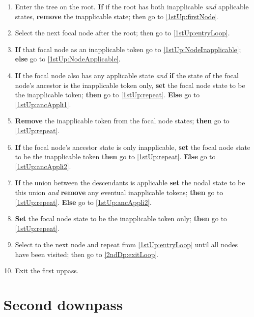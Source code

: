 \documentclass[a4paper,12pt]{article}
\begin{document}
\begin{enumerate}
    \item Enter the tree on the root. \textbf{If} if the root has both inapplicable \textit{and} applicable states, \textbf{remove} the inapplicable state; then go to \ref{1stUp:firstNode}.
    \item \label{1stUp:firstNode} Select the next focal node after the root; then go to \ref{1stUp:entryLoop}. 
    \item \label{1stUp:entryLoop} \textbf{If} that focal node as an inapplicable token go to \ref{1stUp:NodeInapplicable}; \textbf{else} go to \ref{1stUp:NodeApplicable}.
    \item \label{1stUp:NodeInapplicable} \textbf{If} the focal node also has any applicable state \textit{and} \textbf{if} the state of the focal node's ancestor is the inapplicable token only, \textbf{set} the focal node state to be the inapplicable token; \textbf{then} go to \ref{1stUp:repeat}. \textbf{Else} go to \ref{1stUp:ancAppli1}.
    \item \label{1stUp:ancAppli1} \textbf{Remove} the inapplicable token from the focal node states; \textbf{then} go to \ref{1stUp:repeat}.        \item \label{1stUp:NodeApplicable} \textbf{If} the focal node's ancestor state is only inapplicable, \textbf{set} the focal node state to be the inapplicable token \textbf{then} go to \ref{1stUp:repeat}. \textbf{Else} go to \ref{1stUp:ancAppli2}.
    \item \label{1stUp:ancAppli2} \textbf{If} the union between the descendants is applicable \textbf{set} the nodal state to be this union \textit{and} \textbf{remove} any eventual inapplicable tokens; \textbf{then} go to \ref{1stUp:repeat}. \textbf{Else} go to \ref{1stUp:ancAppli2}.
    \item \label{1stUp:ancAppli3} \textbf{Set} the focal node state to be the inapplicable token only; \textbf{then} go to \ref{1stUp:repeat}.
    \item \label{1stUp:repeat} Select to the next node and repeat from \ref{1stUp:entryLoop} until all nodes have been visited; then go to \ref{2ndDp:exitLoop}.
    \item \label{1stUp:exitLoop} Exit the first uppass.
\end{enumerate}


\section{Second downpass} \label{2ndDp}
\end{document}
